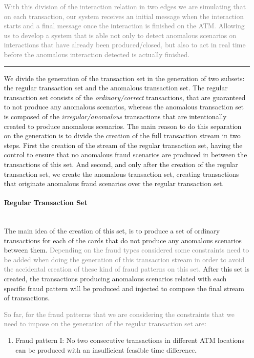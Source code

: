 \textcolor{gray}{With this division of the interaction relation in two edges we are simulating that on each transaction, our system receives an initial message when the interaction starts and a final message once the interaction is finished on the ATM. Allowing us to develop a system that is able not only to detect anomalous scenarios on interactions that have already been produced/closed, but also to act in real time before the anomalous interaction detected is actually finished.}

\textcolor{red}{\rule{\linewidth}{0.5mm}}

We divide the generation of the transaction set in the generation of two subsets: the regular transaction set and the anomalous transaction set. The regular transaction set consists of the \emph{ordinary/correct} transactions, that are guaranteed to not produce any anomalous scenarios, whereas the anomalous transaction set is composed of the \emph{irregular/anomalous} transactions that are intentionally created to produce anomalous scenarios. The main reason to do this separation on the generation is to divide the creation of the full transaction stream in two steps. First the creation of the stream of the regular transaction set, having the control to ensure that no anomalous fraud scenarios are produced in between the transactions of this set. And second, and only after the creation of the regular transaction set, we create the anomalous transaction set, creating transactions that originate anomalous fraud scenarios over the regular transaction set.

\paragraph{Regular Transaction Set\\\\}

The main idea of the creation of this set, is to produce a set of ordinary transactions for each of the cards that do not produce any anomalous scenarios between them. \textcolor{gray}{Depending on the fraud types considered some constraints need to be added when doing the generation of this transaction stream in order to avoid the accidental creation of these kind of fraud patterns on this set.} After this set is created, the transactions producing anomalous scenarios related with each specific fraud pattern will be produced and injected to compose the final stream of transactions. 

\textcolor{gray}{So far, for the fraud patterns that we are considering the constraints that we need to impose on the generation of the regular transaction set are:}
\begin{enumerate}
    \renewcommand{\labelenumi}{\Roman{enumi}.} %
    \item Fraud pattern I: No two consecutive transactions in different ATM locations can be produced with an insufficient feasible time difference.
\end{enumerate}

